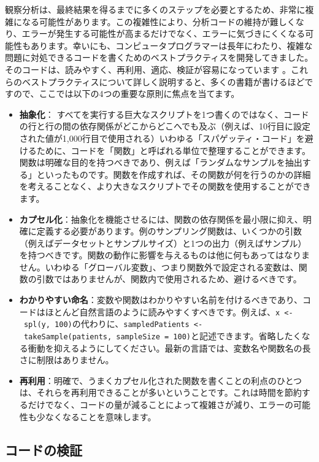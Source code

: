 \documentclass[
  11pt]{book}
\theoremstyle{definition}
\theoremstyle{definition}
\theoremstyle{definition}
\theoremstyle{definition}
\theoremstyle{remark}
\begin{document}
観察分析は、最終結果を得るまでに多くのステップを必要とするため、非常に複雑になる可能性があります。この複雑性により、分析コードの維持が難しくなり、エラーが発生する可能性が高まるだけでなく、エラーに気づきにくくなる可能性もあります。幸いにも、コンピュータプログラマーは長年にわたり、複雑な問題に対処できるコードを書くためのベストプラクティスを開発してきました。そのコードは、読みやすく、再利用、適応、検証が容易になっています \citep{Martin_2008} 。これらのベストプラクティスについて詳しく説明すると、多くの書籍が書けるほどですので、ここでは以下の4つの重要な原則に焦点を当てます。

\begin{itemize}
\item
  \textbf{抽象化}： すべてを実行する巨大なスクリプトを1つ書くのではなく、コードの行と行の間の依存関係がどこからどこへでも及ぶ（例えば、10行目に設定された値が1,000行目で使用される）いわゆる「スパゲッティ・コード」を避けるために、コードを「関数」と呼ばれる単位で整理することができます。関数は明確な目的を持つべきであり、例えば「ランダムなサンプルを抽出する」といったものです。関数を作成すれば、その関数が何を行うのかの詳細を考えることなく、より大きなスクリプトでその関数を使用することができます。
\item
  \textbf{カプセル化}：抽象化を機能させるには、関数の依存関係を最小限に抑え、明確に定義する必要があります。例のサンプリング関数は、いくつかの引数（例えばデータセットとサンプルサイズ）と1つの出力（例えばサンプル）を持つべきです。関数の動作に影響を与えるものは他に何もあってはなりません。いわゆる「グローバル変数」、つまり関数外で設定される変数は、関数の引数ではありませんが、関数内で使用されるため、避けるべきです。
\item
  \textbf{わかりやすい命名}：変数や関数はわかりやすい名前を付けるべきであり、コードはほとんど自然言語のように読みやすくすべきです。例えば、\texttt{x\ \textless{}-\ spl(y,\ 100)}の代わりに、\texttt{sampledPatients\ \textless{}-\ takeSample(patients,\ sampleSize\ =\ 100)}と記述できます。省略したくなる衝動を抑えるようにしてください。最新の言語では、変数名や関数名の長さに制限はありません。
\item
  \textbf{再利用}：明確で、うまくカプセル化された関数を書くことの利点のひとつは、それらを再利用できることが多いということです。これは時間を節約するだけでなく、コードの量が減ることによって複雑さが減り、エラーの可能性も少なくなることを意味します。
\end{itemize}

\subsection{コードの検証}\label{ux30b3ux30fcux30c9ux306eux691cux8a3c}
\end{document}

